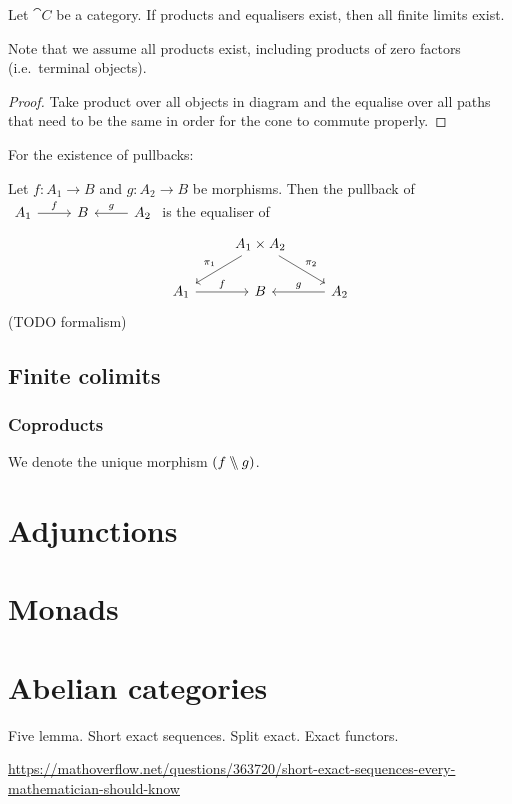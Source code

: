 \begin{proposition}
Let $\cat{C}$ be a category. If products and equalisers exist, then all finite limits exist.
\end{proposition}
Note that we assume all products exist, including products of zero factors (i.e.\ terminal objects).
\begin{proof}
Take product over all objects in diagram and the equalise over all paths that need to be the same in order for the cone to commute properly.
\end{proof}

\begin{example}
For the existence of pullbacks:

Let $f: A_1 \to B$ and $g: A_2 \to B$ be morphisms. Then the pullback of $\begin{tikzcd}
A_1 \ar[r, "f"] & B & \ar[l, swap, "g"] A_2
\end{tikzcd}$ is the equaliser of
\[ \begin{tikzcd}
& A_1 \times A_2 \ar[dl, swap, "\proj_1"] \ar[dr, "\proj_2"] & \\
A_1 \ar[r, "f"] & B & \ar[l, swap, "g"] A_2
\end{tikzcd} \]
(TODO formalism)

\end{example}

\section{Finite colimits}
\subsection{Coproducts}

We denote the unique morphism $(f \bbslash g)$.


\chapter{Adjunctions}
\chapter{Monads}

\chapter{Abelian categories}
Five lemma. Short exact sequences. Split exact. Exact functors.


\url{https://mathoverflow.net/questions/363720/short-exact-sequences-every-mathematician-should-know}